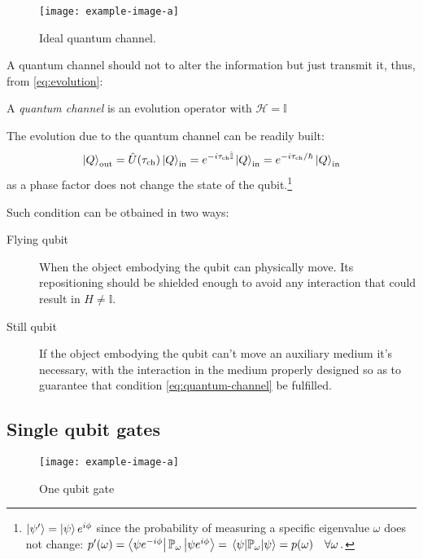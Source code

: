\begin{figure}
\centering
\texttt{[image: example-image-a]}
\caption{Ideal quantum channel.}
\label{fig:quantum-channel}
\end{figure}

A quantum channel should not to alter the information but just transmit it, thus, from \ref{eq:evolution}:
\begin{defn}
A \emph{quantum channel} is an evolution operator with $\mathcal{H}=\mathbb{I}$
\end{defn}
The evolution due to the quantum channel can be readily built:
\begin{equation}\label{eq:quantum-channel}
    \ket{Q}_\text{out} = \hat{U}(\tau_\text{ch}) \ket{Q}_\text{in} = e^{-i\tau_\text{ch}\hat{\mathbb{I}}} \ket{Q}_\text{in} = e^{-i\tau_\text{ch}/\hbar} \ket{Q}_\text{in}
\end{equation}
as a phase factor does not change the state of the qubit.\footnote{$\ket{\psi'}= \ket{\psi}e^{i\phi}$ since the probability of measuring a specific eigenvalue $\omega$ does not change: $p'(\omega) = \bra{\psi e^{-i\phi}}\mathbb{P}_\omega\ket{\psi e^{i\phi}} = \expval{\mathbb{P}_\omega}{\psi} = p(\omega) \quad \forall \omega\,.$}

Such condition can be otbained in two ways:
\begin{description}
\item[Flying qubit] When the object embodying the qubit can physically move. Its repositioning should be shielded enough to avoid any interaction that could result in $H \neq \mathbb{I}$.
\item[Still qubit] If the object embodying the qubit can't move an auxiliary medium it's necessary, with the interaction in the medium properly designed so as to guarantee that condition \ref{eq:quantum-channel} be fulfilled.
\end{description}
\subsection{Single qubit gates}
\begin{figure}
\centering
\texttt{[image: example-image-a]}
\caption{One qubit gate}
\label{fig:single-qubit-gate}
\end{figure}
